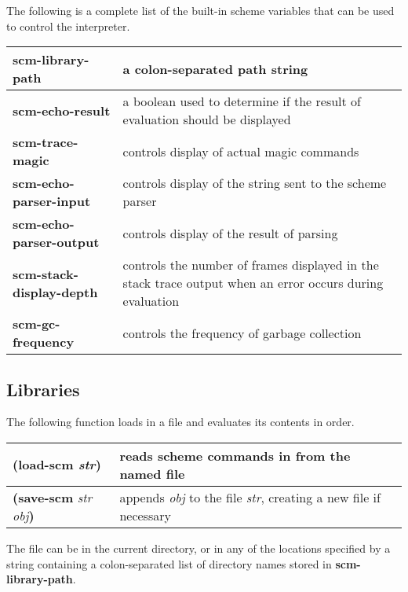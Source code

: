 \documentclass[letterpaper,twoside,12pt]{article}
\begin{document}
The following is a complete list of the built-in scheme variables that
can be used to control the interpreter.

\begin{center}
   \begin{tabular}{|l|p{}|} \hline
	{\bfseries scm-library-path} &
		a colon-separated path string \\ \hline
	{\bfseries scm-echo-result} &
		a boolean used to determine if the result of evaluation
		should be displayed \\ \hline
	{\bfseries scm-trace-magic} &
		controls display of actual magic commands \\ \hline
	{\bfseries scm-echo-parser-input} &
		controls display of the string sent to the scheme parser \\ \hline
	{\bfseries scm-echo-parser-output} &
		controls display of the result of parsing \\ \hline
	{\bfseries scm-stack-display-depth} &
		controls the number of frames displayed in the stack trace
		output when an error occurs during evaluation \\ \hline
	{\bfseries scm-gc-frequency} &
		controls the frequency of garbage collection \\ \hline
   \end{tabular}
\end{center}

\subsection{Libraries}

The following function loads in a file and evaluates its contents in order.

\begin{center}
   \begin{tabular}{|l|l|} \hline
	{\bfseries (load-scm }{\itshape str}{\bfseries )} &
		reads scheme commands in from the named file \\ \hline
	{\bfseries (save-scm }{\itshape str obj}{\bfseries )} &
		appends {\itshape obj} to the file {\itshape str},
		creating a new file if necessary \\ \hline
   \end{tabular}
\end{center}

The file can be in the current directory, or in any of the
locations specified by a string containing a colon-separated list of
directory names stored in {\bfseries scm-library-path}.
\end{document}
